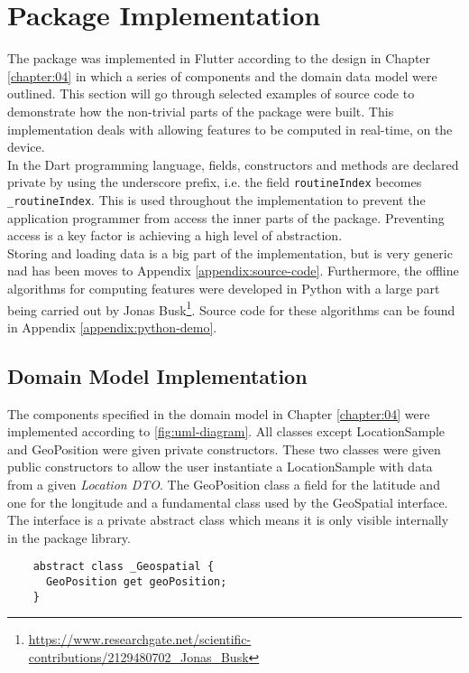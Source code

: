 \section{Package Implementation}
The package was implemented in Flutter according to the design in Chapter \ref{chapter:04} in which a series of components and the domain data model were outlined. This section will go through selected examples of source code to demonstrate how the non-trivial parts of the package were built. This implementation deals with allowing features to be computed in real-time, on the device.\\

In the Dart programming language, fields, constructors and methods are declared private by using the underscore prefix, i.e. the field \verb|routineIndex| becomes \verb|_routineIndex|. This is used throughout the implementation to prevent the application programmer from access the inner parts of the package. Preventing access is a key factor is achieving a high level of abstraction.\\

Storing and loading data is a big part of the implementation, but is very generic nad has been moves to Appendix \ref{appendix:source-code}. Furthermore, the offline algorithms for computing features were developed in Python with a large part being carried out by Jonas Busk\footnote{\url{https://www.researchgate.net/scientific-contributions/2129480702_Jonas_Busk}}. Source code for these algorithms can be found in Appendix \ref{appendix:python-demo}.

\subsection{Domain Model Implementation}
The components specified in the domain model in Chapter \ref{chapter:04} were implemented according to \ref{fig:uml-diagram}. All classes except LocationSample and GeoPosition were given private constructors. These two classes were given public constructors to allow the user instantiate a LocationSample with data from a given \textit{Location DTO}. The GeoPosition class a field for the latitude and one for the longitude and a fundamental class used by the GeoSpatial interface. The interface is a private abstract class which means it is only visible internally in the package library.

\begin{verbatim}
    abstract class _Geospatial {
      GeoPosition get geoPosition;
    }
\end{verbatim}

